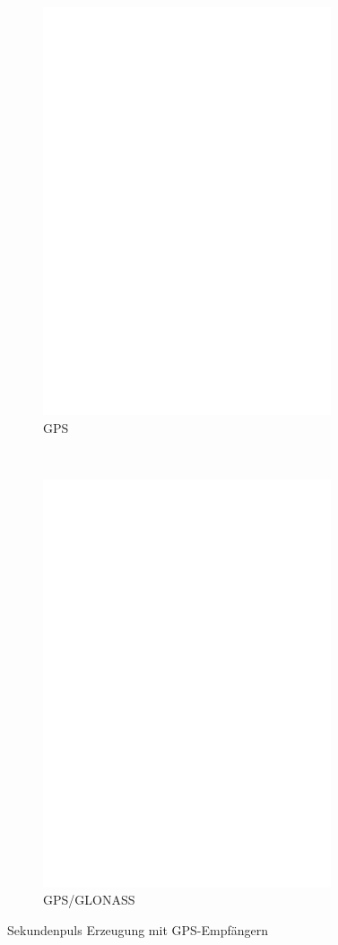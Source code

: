 \begin{figure}[H]
  \begin{subfigure}[b]{9cm}
    \centering
    \includegraphics[width=8.5cm]{../FIG/GPS_UP501.eps}
    \caption{GPS}
  \end{subfigure}
  ~
  \begin{subfigure}[b]{9cm}
    \centering
    \includegraphics[width=8.5cm]{../FIG/GPS_GNS701.eps}
    \caption{GPS/GLONASS}
  \end{subfigure}
  \caption{Sekundenpuls Erzeugung mit GPS-Empfängern }
  \label{fig:GPS-1PPS}
\end{figure}

